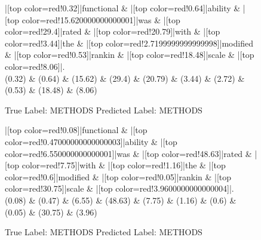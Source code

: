 \documentclass[a4paper, landscape]{article}
\begin{document}
\clearpage
\begin{figure}
\begin{center}
\begin{dependency}
\begin{deptext}
|[top color=red!0.32]|functional \& |[top color=red!0.64]|ability \& |[top color=red!15.620000000000001]|was \& |[top color=red!29.4]|rated \& |[top color=red!20.79]|with \& |[top color=red!3.44]|the \& |[top color=red!2.7199999999999998]|modified \& |[top color=red!0.53]|rankin \& |[top color=red!18.48]|scale \& |[top color=red!8.06]|.\\
(0.32) \& (0.64) \& (15.62) \& (29.4) \& (20.79) \& (3.44) \& (2.72) \& (0.53) \& (18.48) \& (8.06)\\
\end{deptext}
\end{dependency}
\end{center}
\caption{True Label: METHODS Predicted Label: METHODS}
\end{figure}
\clearpage
\begin{figure}
\begin{center}
\begin{dependency}
\begin{deptext}
|[top color=red!0.08]|functional \& |[top color=red!0.47000000000000003]|ability \& |[top color=red!6.550000000000001]|was \& |[top color=red!48.63]|rated \& |[top color=red!7.75]|with \& |[top color=red!1.16]|the \& |[top color=red!0.6]|modified \& |[top color=red!0.05]|rankin \& |[top color=red!30.75]|scale \& |[top color=red!3.9600000000000004]|.\\
(0.08) \& (0.47) \& (6.55) \& (48.63) \& (7.75) \& (1.16) \& (0.6) \& (0.05) \& (30.75) \& (3.96)\\
\end{deptext}
\end{dependency}
\end{center}
\caption{True Label: METHODS Predicted Label: METHODS}
\end{figure}
\end{document}
